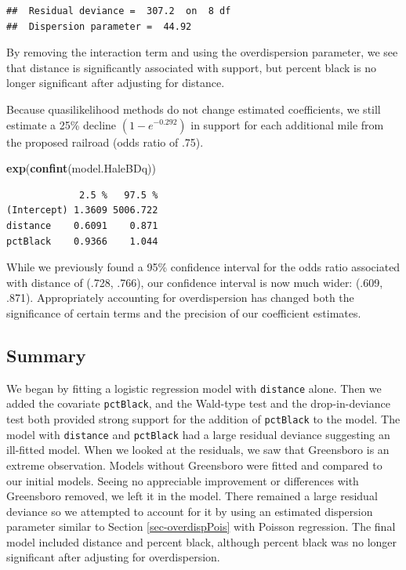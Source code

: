 \documentclass[
]{krantz}
\newenvironment{Shaded}{\begin{snugshade}}{\end{snugshade}}
\newcommand{\KeywordTok}[1]{\textcolor[rgb]{0.27,0.27,0.27}{\textbf{#1}}}
\newcommand{\NormalTok}[1]{#1}
\begin{document}
\begin{verbatim}
##  Residual deviance =  307.2  on  8 df 
##  Dispersion parameter =  44.92
\end{verbatim}

By removing the interaction term and using the overdispersion parameter, we see that distance is significantly associated with support, but percent black is no longer significant after adjusting for distance.

Because quasilikelihood methods do not change estimated coefficients, we still estimate a 25\% decline \((1-e^{-0.292})\) in support for each additional mile from the proposed railroad (odds ratio of .75).

\begin{Shaded}
\begin{Highlighting}[]
\KeywordTok{exp}\NormalTok{(}\KeywordTok{confint}\NormalTok{(model.HaleBDq))}
\end{Highlighting}
\end{Shaded}

\begin{verbatim}
             2.5 %   97.5 %
(Intercept) 1.3609 5006.722
distance    0.6091    0.871
pctBlack    0.9366    1.044
\end{verbatim}

While we previously found a 95\% confidence interval for the odds ratio associated with distance of (.728, .766), our confidence interval is now much wider: (.609, .871). Appropriately accounting for overdispersion has changed both the significance of certain terms and the precision of our coefficient estimates.

\hypertarget{summary-1}{%
\subsection{Summary}\label{summary-1}}

We began by fitting a logistic regression model with \texttt{distance} alone. Then we added the covariate \texttt{pctBlack}, and the Wald-type test and the drop-in-deviance test both provided strong support for the addition of \texttt{pctBlack} to the model. The model with \texttt{distance} and \texttt{pctBlack} had a large residual deviance suggesting an ill-fitted model. When we looked at the residuals, we saw that Greensboro is an extreme observation. Models without Greensboro were fitted and compared to our initial models. Seeing no appreciable improvement or differences with Greensboro removed, we left it in the model. There remained a large residual deviance so we attempted to account for it by using an estimated dispersion parameter similar to Section \ref{sec-overdispPois} with Poisson regression. The final model included distance and percent black, although percent black was no longer significant after adjusting for overdispersion.
\end{document}
